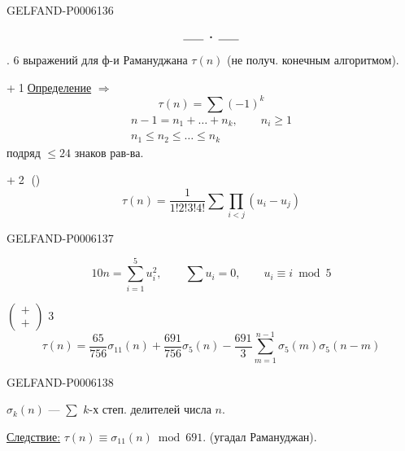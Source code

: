 \begin{GelfandAdjacentEvidence}{GELFAND-P000613}{6}

\[\rule{1.8em}{.4pt}\;\boldsymbol{\cdot}\;\rule{1.8em}{.4pt}\]
. 6 выражений для ф-и Рамануджана \(\tau(n)\) (не получ. конечным алгоритмом).

\textcircled{\scriptsize +}\quad\textcircled{\scriptsize 1}\quad\underline{Определение} \(\Rightarrow\)
\[
\tau(n)=\sum(-1)^k
\]
\[
\begin{gathered}
n-1=n_1+\ldots+n_k,\qquad n_i\ge1\\
n_1\le n_2\le\ldots\le n_k
\end{gathered}
\]
подряд \(\le24\) знаков рав-ва.

\textcircled{\scriptsize +}\quad\textcircled{\scriptsize 2}\quad{} ()
\[
\tau(n)=\frac1{1!2!3!4!}\sum\prod_{i<j}(u_i-u_j)
\]
\end{GelfandAdjacentEvidence}
\begin{GelfandAdjacentEvidence}{GELFAND-P000613}{7}

\[
10n=\sum_{i=1}^5u_i^2,\qquad\sum u_i=0,\qquad u_i\equiv i\bmod5
\]

\(\left(\begin{smallmatrix}+\\+\end{smallmatrix}\right)\)
\quad\textcircled{\scriptsize 3}\quad{}
\[
\tau(n)=\frac{65}{756}\sigma_{11}(n)+\frac{691}{756}\sigma_5(n)
-\frac{691}{3}\sum_{m=1}^{n-1}\sigma_5(m)\sigma_5(n-m)
\]
\end{GelfandAdjacentEvidence}
\begin{GelfandAdjacentEvidence}{GELFAND-P000613}{8}

\end{GelfandAdjacentEvidence}

\(\sigma_k(n)\) — \(\sum\) \(k\)-х степ. делителей числа \(n\).

\underline{Следствие:} \(\tau(n)\equiv\sigma_{11}(n)\bmod691\).
(угадал Рамануджан).


